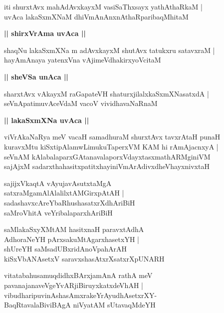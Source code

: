 \documentclass[twoside,12pt,openright]{book}
\newcounter{shloka}[chapter]
\def\uvaca#1{\centerline{{\large\textbf{#1}}}}
\begin{document}
\begin{shloka}%
iti shurxtAvx mahAdAvxkayxM vasiSaThxsayx yathAthaRkaM |\\
uvAca lakaSxmXNaM dhiVmAnAnxnAthaRparibaqMhitaM 
\end{shloka}

\uvaca{|| shirxVrAma uvAca ||}

\begin{shloka}%
shaqNu lakaSxmXNa m adAvxkayxM shutAvx tatukxru satavxraM |\\
hayAmAnaya yatenxVna vAjimeVdhakirxyoVcitaM 
\end{shloka}
\uvaca{|| sheVSa unAca ||}

\begin{shloka}%
sharxtAvx vAkayxM raGapateVH shaturxjilalxkaSxmXNasatxdA |\\
seVnApatimuvAceVdaM vacoV vividhavaNaRnaM 
\end{shloka}

\uvaca{|| lakaSxmXNa uvAca ||}

\begin{shloka}%
viVrAkaNaRya meV vacaH samadhuraM shurxtAvx tavxrAtaH punaH \\
kuravxMtu kiSxtipAlamwLimukuTaperxVM KAM hi rAmAjacnxyA |\\
seVnAM kAlabalaparxGAtanavalaporxVdayxtasxmathARMginiVM \\
sajAjxM sadarxthahasitxpatitxhayiniVmArAdivxdheVhayxnivxtaH 
\end{shloka}

\begin{shloka}%
sajijxVkaqtA vAyujavAsutxtaMgA \\
satxraMgamAlAlalilxtAMGirxpAtAH |\\
sadashavxcAreYbaRhushasatxrXdhAriBiH\\
saMroVhitA veYribalaparxhAriBiH
\end{shloka}

\begin{shloka}%
saMlakaSxyXMtAM hasitxnaH paravxtAdhA \\
AdhoraNeYH pArxsakuMtAgarxhasetxYH |\\
shUreYH saMsadUBxridAnoVpahArAH \\
kiSxVbANAsetxV saravxshasAtxrXsatxrXpUNARH
\end{shloka}

\begin{shloka}%
vitatabahusamuqdidhxBArxjamAnA rathA meV \\
pavanajanaveVgeYvARjiBiruyxkatxdeVhAH |\\
vibudharipuvinAshasAmxrakeYrAyudhAsetxrXY-\\
BaqRtavalaBiviBAgA niVyatAM sUtavaqMdeYH
\end{shloka}
\end{document}
